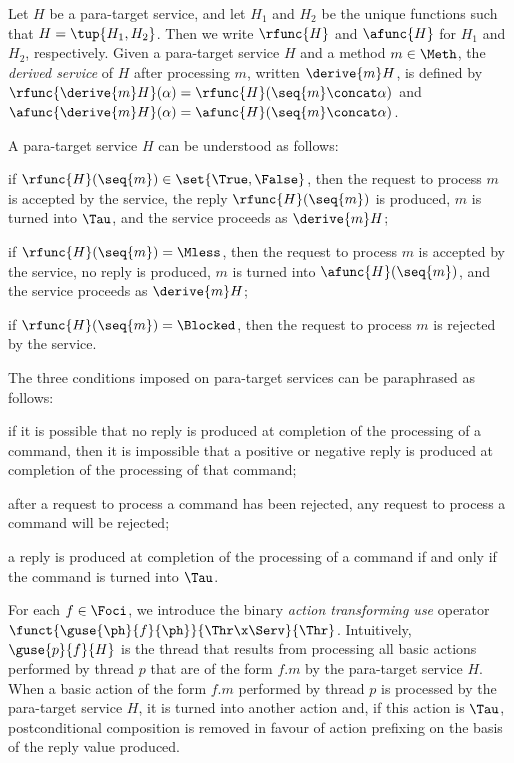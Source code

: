 \documentclass[fleqn]{llncs}
\begin{document}
Let $H$ be a para-target service, and let $H_1$ and $H_2$ be the unique
functions such that $H = \tup{H_1,H_2}$.
Then we write $\rfunc{H}$ and $\afunc{H}$ for $H_1$ and $H_2$,
respectively.
Given a para-target service $H$ and a method $m \in \Meth$,
the \emph{derived service} of $H$ after processing $m$,
written $\derive{m}H$, is defined by
$\rfunc{\derive{m}H}(\alpha) = \rfunc{H}(\seq{m} \concat \alpha)$ and
$\afunc{\derive{m}H}(\alpha) = \afunc{H}(\seq{m} \concat \alpha)$.

A para-target service $H$ can be understood as follows:
\begin{iteml}
\item
if $\rfunc{H}(\seq{m}) \in \set{\True,\False}$, then the request to
process $m$ is accepted by the service, the reply $\rfunc{H}(\seq{m})$
is produced, $m$ is turned into $\Tau$, and the service proceeds as
$\derive{m}H$;
\item
if $\rfunc{H}(\seq{m}) = \Mless$, then the request to process $m$ is
accepted by the service, no reply is produced, $m$ is turned into
$\afunc{H}(\seq{m})$, and the service proceeds as $\derive{m}H$;
\item
if $\rfunc{H}(\seq{m}) = \Blocked$, then the request to process $m$ is
rejected by the service.
\end{iteml}
The three conditions imposed on para-target services can be paraphrased
as follows:
\begin{iteml}
\item
if it is possible that no reply is produced at completion of the
processing of a command, then it is impossible that a positive or
negative reply is produced at completion of the processing of that
command;
\item
after a request to process a command has been rejected, any request to
process a command will be rejected;
\item
a reply is produced at completion of the processing of a command if and
only if the command is turned into $\Tau$.
\end{iteml}

For each $f \in \Foci$, we introduce the binary
\emph{action transforming use} operator
$\funct{\guse{\ph}{f}{\ph}}{\Thr \x \Serv}{\Thr}$.
Intuitively, $\guse{p}{f}{H}$ is the thread that results from processing
all basic actions performed by thread $p$ that are of the form $f.m$ by
the para-target service $H$.
When a basic action of the form $f.m$ performed by thread $p$ is
processed by the para-target service $H$, it is turned into another
action and, if this action is $\Tau$, postconditional composition is
removed in favour of action prefixing on the basis of the reply value
produced.
\end{document}

